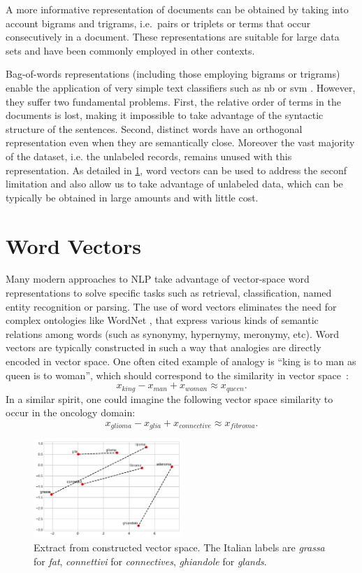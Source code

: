 A more informative representation of documents can be obtained by
taking into account bigrams and trigrams, i.e.\ pairs or triplets or
terms that occur consecutively in a document. These representations
are suitable for large data sets and have been commonly employed in
other contexts.

Bag-of-words representations (including those employing bigrams or
trigrams) enable the application of very simple text classifiers such
as \ac{nb} or \ac{svm} \cite{cortes-support-1995}. However, they
suffer two fundamental problems. First, the relative order of terms in
the documents is lost, making it impossible to take advantage of the
syntactic structure of the sentences. Second, distinct words have an
orthogonal representation even when they are semantically
close. Moreover the vast majority of the dataset, i.e. the unlabeled
records, remains unused with
this representation. As detailed in \cref{sec:word-vectors}, word
vectors can be used to address the seconf limitation and also allow us
to take advantage of unlabeled data, which can be typically be
obtained in large amounts and with little cost.

\section{Word Vectors}
\label{sec:word-vectors}
Many modern approaches to NLP take advantage of vector-space word
representations to solve specific tasks such as retrieval,
classification, named entity recognition or parsing. %
The use of word vectors eliminates the need for complex ontologies
like WordNet \cite{fellbaum-wordnet-1998}, that express various kinds of semantic relations among
words (such as synonymy, hypernymy, meronymy, etc). Word vectors are
typically constructed in such a way that analogies are directly
encoded in vector space. One often cited example of analogy is ``king
is to man as queen is to woman'', which should correspond to the
similarity in vector space~\cite{mikolov_linguistic_2013}:
$$
x_\mathit{king}-x_\mathit{man}+x_\mathit{woman} \approx x_\mathit{queen}.
$$
In a similar spirit, one could imagine the following vector space
similarity to occur in the oncology domain:
$$
x_\mathit{glioma}-x_\mathit{glia}+x_\mathit{connective} \approx
x_\mathit{fibroma}.
$$
\begin{figure}
  \centering
  \includegraphics[width=0.5\textwidth]{img/gloveGraph.pdf}
  \caption{Extract from constructed vector space. The Italian labels
    are \emph{grassa} for \emph{fat}, \emph{connettivi} for
    \emph{connectives}, \emph{ghiandole} for \emph{glands}.}
  \label{fig:gloveGraph}
\end{figure}

